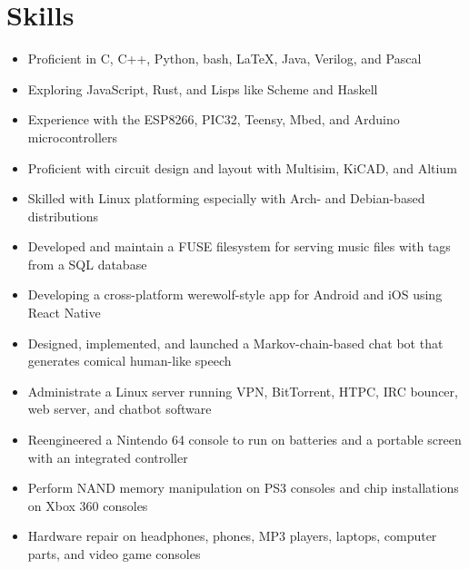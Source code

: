 \documentclass[letterpaper,10pt]{article}
\begin{document}
\section{Skills}
\begin{itemize}
\item Proficient in C, C++, Python, bash, \LaTeX, Java, Verilog, and Pascal
\item Exploring JavaScript, Rust, and Lisps like Scheme and Haskell
\item Experience with the ESP8266, PIC32, Teensy, Mbed, and Arduino microcontrollers
\item Proficient with circuit design and layout with Multisim, KiCAD, and Altium
\item Skilled with Linux platforming especially with Arch- and Debian-based distributions
\item Developed and maintain a FUSE filesystem for serving music files with tags from a SQL database
\item Developing a cross-platform werewolf-style app for Android and iOS using React Native
\item Designed, implemented, and launched a Markov-chain-based chat bot that generates comical human-like speech
\item Administrate a Linux server running VPN, BitTorrent, HTPC, IRC bouncer, web server, and chatbot software
\item Reengineered a Nintendo 64 console to run on batteries and a portable screen with an integrated controller
\item Perform NAND memory manipulation on PS3 consoles and chip installations on Xbox 360 consoles
\item Hardware repair on headphones, phones, MP3 players, laptops, computer parts, and video game consoles
\end{itemize}
\end{document}

